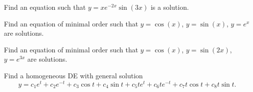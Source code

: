 \documentclass{ximera}
\begin{document}
\begin{exercise}
    Find an equation such that $y=xe^{-2x}\sin(3x)$ is a solution.
\end{exercise}

\begin{exercise}%
    Find an equation of minimal order such that $y=\cos(x)$, $y=\sin(x)$, $y=e^x$ are solutions.
\end{exercise}

\begin{exercise}
    Find an equation of minimal order such that $y=\cos(x)$, $y=\sin(2x)$, $y=e^{3x}$ are solutions.
\end{exercise}

\begin{exercise}
    Find a homogeneous DE with general solution %
    $$y=c_1e^t+ c_2e^{-t}+ c_3\cos t+ c_4\sin t + c_5te^t+ c_6te^{-t}+ c_7t\cos t+ c_8t\sin t.$$
\end{exercise}



\end{document}
